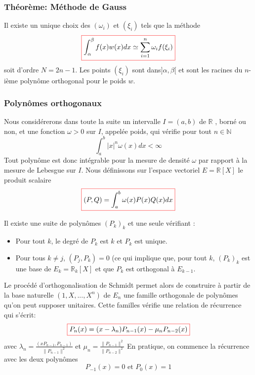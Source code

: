 \documentclass{beamer}
\newcommand{\myredbox}[1]{\fcolorbox{red}{white}{$\displaystyle#1$}}
\begin{document}
 
\begin{frame}
 \frametitle{Théorème:  Méthode de Gauss}
Il existe un unique choix des $(\omega_i)$ et $(\xi_i)$ tels que la méthode
  \[\myredbox{  \int_{\alpha}^{\beta} f(x)w(x) dx \simeq \sum_{i=1}^{n}\omega_i f(\xi_i)}\]
soit d'ordre $N=2n-1$. Les points $(\xi_i)$  sont dans$]\alpha,\beta[$ et sont les racines du $n$-ième polynôme orthogonal pour le poids $w$.  
 \end{frame}
\begin{frame}
\frametitle{Polynômes orthogonaux}

Nous considérerons dans toute la suite un intervalle $I=(a,b)$ de $\mathbb{R}$
, borné ou non, et une fonction $\omega > 0$ sur $I$, appelée poids, qui vérifie pour tout $n\in\mathbb{N}$
\[\int_a^b|x|^n\omega(x)dx<\infty\]
Tout polynôme est donc intégrable pour la mesure de densité $\omega$ par rapport à la mesure de Lebesgue sur $I$. Nous définissons sur l'espace vectoriel $E=\mathbb{R}[X]$ le produit scalaire
\[\myredbox{(P,Q)=\int_a^b \omega(x) P(x) Q(x) dx}\]
\begin{theorem}
Il existe une suite de polynômes $\left(P_k\right)_k$ et une seule vérifiant :
\begin{itemize}
\item Pour tout $k$, le degré de $P_k$ est $k$ et $P_k$ est unique.
\item Pour tous $k \neq j$, $(P_j , P_k) = 0$ (ce qui implique que, pour tout $k$,
$\left(P_k\right)_k$ est une base de $E_k=\mathbb{R}_k[X]$ et que $P_k$ est orthogonal à $E_{k-1}$.
\end{itemize}
\end{theorem}
\end{frame}


\begin{frame}
Le procédé d'orthogonalisation de Schmidt permet alors de construire à partir de la base naturelle $(1,X,...,X^n)$ de $E_n$ une famille orthogonale de polynômes qu'on peut supposer unitaires.  Cette familles vérifie une relation de récurrence qui s'écrit:
\[\myredbox{P_n(x)=(x-\lambda_n)P_{n-1}(x)-\mu_n P_{n-2}(x)}\]
avec $\lambda_n=\frac{(xP_{n-1},P_{n-1})}{\|P_{n-1}\|^2}$ et $\mu_n=\frac{\|P_{n-1}\|^2}{\|P_{n-2}\|^2}$ 
En pratique, on commence la récurrence avec les deux polynômes 
\[P_{-1}(x)=0\mbox{ et } P_{0}(x)=1\]
\end{frame}
\end{document}
